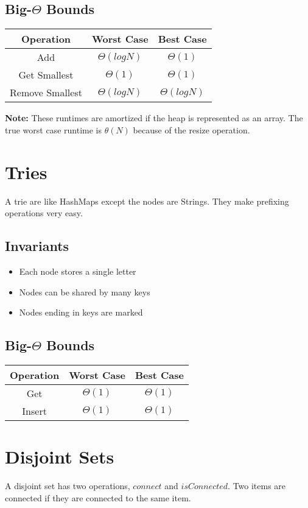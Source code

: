 \documentclass{article}
\begin{document}
\subsection{Big-$\Theta$ Bounds}
\begin{center}
    \begin{tabular}{ c | c | c }
     Operation & Worst Case & Best Case\\
     \hline
     Add & $\Theta(log N)$ & $\Theta(1)$\\ 
     Get Smallest & $\Theta(1)$ & $\Theta(1)$\\  
     Remove Smallest & $\Theta(logN)$ & $\Theta(logN)$\\
    \end{tabular}
\end{center}
\textbf{Note:} These runtimes are amortized if the heap is represented as an array.
The true worst case runtime is $\theta(N)$ because of the resize operation.
\section{Tries}
A trie are like HashMaps except the nodes are Strings. They make prefixing operations very easy.
\subsection{Invariants}
\begin{itemize}
    \item Each node stores a single letter
    \item Nodes can be shared by many keys
    \item Nodes ending in keys are marked
\end{itemize}
\subsection{Big-$\Theta$ Bounds}
\begin{center}
    \begin{tabular}{ c | c | c }
     Operation & Worst Case & Best Case\\
     \hline
     Get & $\Theta(1)$ & $\Theta(1)$\\ 
     Insert & $\Theta(1)$ & $\Theta(1)$\\  
    \end{tabular}
\end{center}
\section{Disjoint Sets}
A disjoint set has two operations, $connect$ and $isConnected$. Two items are connected if they are connected to the same item.
\end{document}
